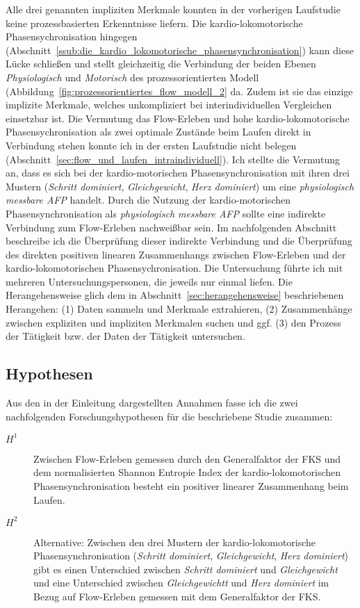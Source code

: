 Alle drei genannten impliziten Merkmale konnten in der vorherigen Laufstudie keine prozessbasierten Erkenntnisse liefern. Die kardio-lokomotorische Phasensychronisation hingegen (Abschnitt~\ref{ssub:die_kardio_lokomotorische_phasensynchronisation}) kann diese Lücke schließen und stellt gleichzeitig die Verbindung der beiden Ebenen \emph{Physiologisch} und \emph{Motorisch} des prozessorientierten Modell (Abbildung~\ref{fig:prozessorientiertes_flow_modell_2} da. Zudem ist sie das einzige implizite Merkmale, welches unkompliziert bei interindividuellen Vergleichen einsetzbar ist. Die Vermutung das Flow-Erleben und hohe kardio-lokomotorische Phasensychronisation als zwei optimale Zustände beim Laufen direkt in Verbindung stehen konnte ich in der ersten Laufstudie nicht belegen (Abschnitt~\ref{sec:flow_und_laufen_intraindividuell}). Ich stellte die Vermutung an, dass es sich bei der kardio-motorischen Phasensynchronisation mit ihren drei Mustern (\emph{Schritt dominiert}, \emph{Gleichgewicht}, \emph{Herz dominiert}) um eine \emph{physiologisch messbare \ac{AFP}} handelt. Durch die Nutzung der kardio-motorischen Phasensynchronisation als \emph{physiologisch messbare \ac{AFP}} sollte eine indirekte Verbindung zum Flow-Erleben nachweißbar sein. Im nachfolgenden Abschnitt beschreibe ich die Überprüfung dieser indirekte Verbindung und die Überprüfung des direkten positiven linearen Zusammenhangs zwischen Flow-Erleben und der kardio-lokomotorischen Phasensychronisation. Die Untersuchung führte ich mit mehreren Untersuchungspersonen, die jeweils nur einmal liefen. Die Herangehensweise glich dem in Abschnitt~\ref{sec:herangehensweise} beschriebenen Herangehen: (1) Daten sammeln und Merkmale extrahieren, (2) Zusammenhänge zwischen expliziten und impliziten Merkmalen suchen und ggf. (3) den Prozess der Tätigkeit bzw. der Daten der Tätigkeit untersuchen. 

\subsection{Hypothesen} 

\label{sub:hypothesen}

Aus den in der Einleitung dargestellten Annahmen fasse ich die zwei nachfolgenden Forschungshypothesen für die beschriebene Studie zusammen: 
\begin{description}
	\item[$H^1$] Zwischen Flow-Erleben gemessen durch den Generalfaktor der \ac{FKS} und dem normalisierten Shannon Entropie Index der kardio-lokomotorischen Phasensynchronisation besteht ein positiver linearer Zusammenhang beim Laufen. 
	\item[$H^2$] Alternative: Zwischen den drei Mustern der kardio-lokomotorische Phasensynchronisation (\emph{Schritt dominiert}, \emph{Gleichgewicht}, \emph{Herz dominiert}) gibt es einen Unterschied zwischen \emph{Schritt dominiert} und \emph{Gleichgewicht} und eine Unterschied zwischen \emph{Gleichgewichtt} und \emph{Herz dominiert} im Bezug auf Flow-Erleben gemessen mit dem Generalfaktor der \ac{FKS}.
\end{description}

